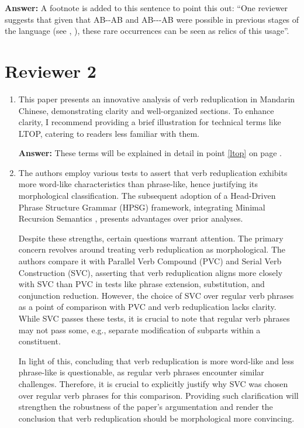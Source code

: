 \documentclass[fleqn,twoside]{article}
\begin{document}
\begin{enumerate}
\textbf{Answer:} A footnote is added to this sentence to point this out: 
``One reviewer suggests that given that AB--AB and AB---AB were possible in previous stages of the language (see \citealt[15]{Zhang2000}, \citealt[160--161]{BascianoMelloni2017}), these rare occurrences can be seen as relics of this usage''.

\end{enumerate}


\section{Reviewer 2}\label{sec:2}
\begin{enumerate}
\item
This paper presents an innovative analysis of verb reduplication in Mandarin Chinese, demonstrating
clarity and well-organized sections. To enhance clarity, I recommend providing a brief illustration for
technical terms like LTOP, catering to readers less familiar with them.

\textbf{Answer:} These terms will be explained in detail in point \ref{ltop} on page \pageref{ltop}.

\item
The authors employ various tests to assert that verb reduplication exhibits more word-like
characteristics than phrase-like, hence justifying its morphological classification. The subsequent
adoption of a Head-Driven Phrase Structure Grammar (HPSG) framework, integrating Minimal
Recursion Semantics \citep{Copestakeetal2005}, presents advantages over prior analyses.

Despite these strengths, certain questions warrant attention. The primary concern revolves around
treating verb reduplication as morphological. The authors compare it with Parallel Verb Compound
(PVC) and Serial Verb Construction (SVC), asserting that verb reduplication aligns more closely with
SVC than PVC in tests like phrase extension, substitution, and conjunction reduction. However, the
choice of SVC over regular verb phrases as a point of comparison with PVC and verb reduplication
lacks clarity. While SVC passes these tests, it is crucial to note that regular verb phrases may not pass
some, e.g., separate modification of subparts within a constituent.

In light of this, concluding that verb reduplication is more word-like and less phrase-like is
questionable, as regular verb phrases encounter similar challenges. Therefore, it is crucial to
explicitly justify why SVC was chosen over regular verb phrases for this comparison. Providing such
clarification will strengthen the robustness of the paper's argumentation and render the conclusion
that verb reduplication should be morphological more convincing.


\end{enumerate}
\end{document}
